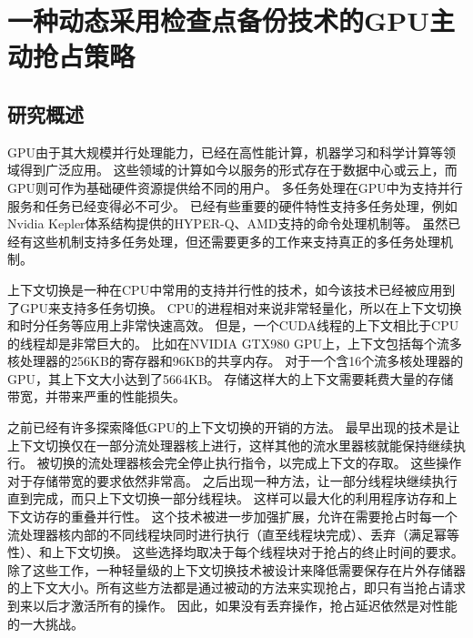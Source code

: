 \chapter{一种动态采用检查点备份技术的GPU主动抢占策略}
\label{chap:PEP}

\section{研究概述}

GPU由于其大规模并行处理能力，已经在高性能计算，机器学习和科学计算等领域得到广泛应用。
这些领域的计算如今以服务的形式存在于数据中心或云上，而GPU则可作为基础硬件资源提供给不同的用户。
多任务处理在GPU中为支持并行服务和任务已经变得必不可少。
已经有些重要的硬件特性支持多任务处理，例如Nvidia Kepler体系结构提供的HYPER-Q、AMD支持的命令处理机制等。
虽然已经有这些机制支持多任务处理，但还需要更多的工作来支持真正的多任务处理机制。

上下文切换是一种在CPU中常用的支持并行性的技术，如今该技术已经被应用到了GPU来支持多任务切换。
CPU的进程相对来说非常轻量化，所以在上下文切换和时分任务等应用上非常快速高效。
但是，一个CUDA线程的上下文相比于CPU的线程却是非常巨大的。
比如在NVIDIA GTX980 GPU上，上下文包括每个流多核处理器的256KB的寄存器和96KB的共享内存。
对于一个含16个流多核处理器的GPU，其上下文大小达到了5664KB。
存储这样大的上下文需要耗费大量的存储带宽，并带来严重的性能损失。

之前已经有许多探索降低GPU的上下文切换的开销的方法。
最早出现的技术是让上下文切换仅在一部分流处理器核上进行，这样其他的流水里器核就能保持继续执行。
被切换的流处理器核会完全停止执行指令，以完成上下文的存取。
这些操作对于存储带宽的要求依然非常高。
之后出现一种方法，让一部分线程块继续执行直到完成，而只上下文切换一部分线程块。
这样可以最大化的利用程序访存和上下文访存的重叠并行性。
这个技术被进一步加强扩展，允许在需要抢占时每一个流处理器核内部的不同线程块同时进行执行（直至线程块完成）、丢弃（满足幂等性）、和上下文切换。
这些选择均取决于每个线程块对于抢占的终止时间的要求。
除了这些工作，一种轻量级的上下文切换技术被设计来降低需要保存在片外存储器的上下文大小。所有这些方法都是通过被动的方法来实现抢占，即只有当抢占请求到来以后才激活所有的操作。
因此，如果没有丢弃操作，抢占延迟依然是对性能的一大挑战。

